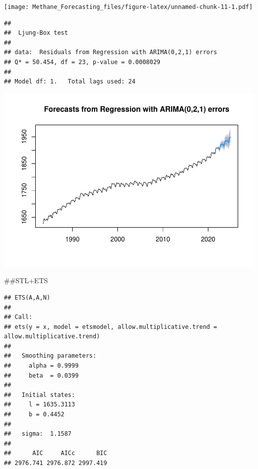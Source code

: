 \documentclass[
]{article}
\newenvironment{Shaded}{\begin{snugshade}}{\end{snugshade}}
\newcommand{\AttributeTok}[1]{\textcolor[rgb]{0.13,0.29,0.53}{#1}}
\newcommand{\CommentTok}[1]{\textcolor[rgb]{0.56,0.35,0.01}{\textit{#1}}}
\newcommand{\FunctionTok}[1]{\textcolor[rgb]{0.13,0.29,0.53}{\textbf{#1}}}
\newcommand{\NormalTok}[1]{#1}
\newcommand{\OtherTok}[1]{\textcolor[rgb]{0.56,0.35,0.01}{#1}}
\newcommand{\SpecialCharTok}[1]{\textcolor[rgb]{0.81,0.36,0.00}{\textbf{#1}}}
\newcommand{\StringTok}[1]{\textcolor[rgb]{0.31,0.60,0.02}{#1}}
\begin{document}
\texttt{[image: Methane\_Forecasting\_files/figure-latex/unnamed-chunk-11-1.pdf]}

\begin{verbatim}
## 
##  Ljung-Box test
## 
## data:  Residuals from Regression with ARIMA(0,2,1) errors
## Q* = 50.454, df = 23, p-value = 0.0008029
## 
## Model df: 1.   Total lags used: 24
\end{verbatim}

\includegraphics{Methane_Forecasting_files/figure-latex/unnamed-chunk-11-2.pdf}

\#\#STL+ETS

\begin{Shaded}
\end{Shaded}

\begin{verbatim}
## ETS(A,A,N) 
## 
## Call:
## ets(y = x, model = etsmodel, allow.multiplicative.trend = allow.multiplicative.trend)
## 
##   Smoothing parameters:
##     alpha = 0.9999 
##     beta  = 0.0399 
## 
##   Initial states:
##     l = 1635.3113 
##     b = 0.4452 
## 
##   sigma:  1.1587
## 
##      AIC     AICc      BIC 
## 2976.741 2976.872 2997.419
\end{verbatim}
\end{document}
